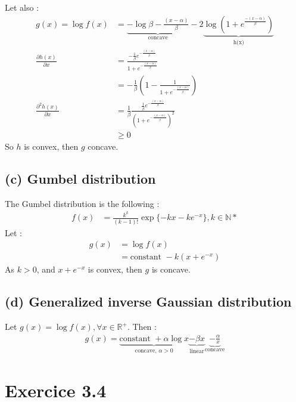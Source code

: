 \documentclass{article}
\newcommand{\N}{\mathbb N}
\newcommand{\R}{\mathbb R}
\begin{document}
\noindent Let also : 
\begin{align*}
    g(x) = \log f(x) &= \underset{\text{concave}}{\underbrace{- \log \beta - \frac{(x-\alpha)}{\beta}}}
                        - 2 \underset{\text{h(x)}}{\underbrace{\log (1+e^{\frac{-(x - \alpha)}{\beta}})}} \\
    \frac{\partial h(x)}{\partial x} 
                     &= \frac{- \frac{1}{\beta}e^{-\frac{(x-\alpha)}{\beta}}}
                        {1+ e^{-\frac{(x-\alpha)}{\beta}}} \\
                     &= -\frac{1}{\beta}\left (1-\frac{1}{1+e^{-\frac{(x-\alpha)}{\beta}}} \right ) \\
    \frac{\partial^2 h(x)}{\partial x} 
                     &= \frac{1}{\beta} \frac{\frac{1}{\beta}e^{-\frac{(x-\alpha)}{\beta}} }{\left (1+ e^{-\frac{(x-\alpha)}{\beta}}\right )^2} \\
                     & \geq 0
\end{align*}
So $h$ is convex, then $g$ concave.

\subsection*{(c) Gumbel distribution }
The Gumbel distribution is the following : 
\begin{align*}
    f(x) &= \frac{k^k}{(k-1)!} \exp \{-kx -ke^{-x} \}, k \in \N*
\end{align*}
Let :
\begin{align*}
    g(x) &= \log f(x) \\
         &= \text{constant } - k(x + e^{-x}) 
\end{align*}
As $k>0$, and $x + e^{-x}$ is convex, then $g$ is concave. 

\subsection*{(d) Generalized inverse Gaussian distribution}
Let $g(x) = \log f(x), \forall x \in \R^+$. 
Then :
\begin{align*}
    g(x) = \underset{\text{concave, } \alpha > 0}{\underbrace{\text{constant } + \alpha \log x }}
    \underset{\text{linear}}{\underbrace{- \beta x}} 
    \underset{\text{concave}}{\underbrace{- \frac{\alpha}{x}}}
\end{align*}

\section*{Exercice 3.4}
\end{document}
